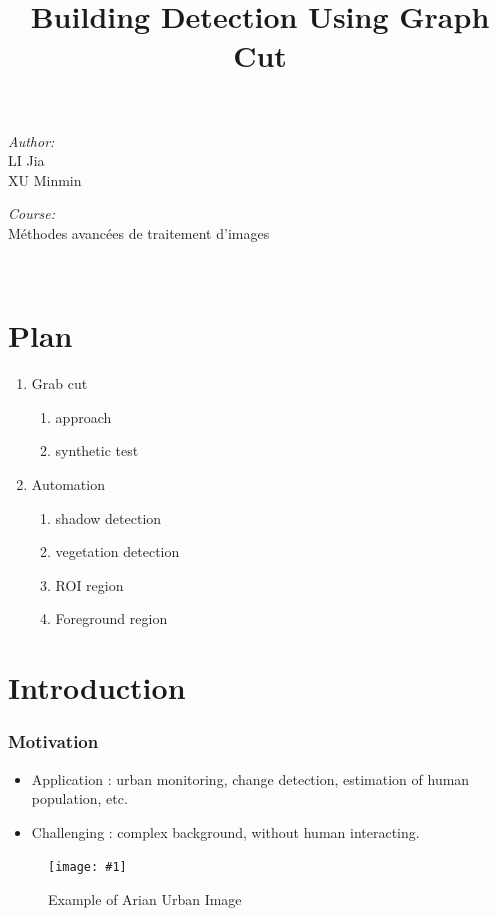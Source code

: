 \documentclass[compress]{beamer} %
\newcommand{\insertF}[3]{
  \begin{figure}[h!]
    \centering
    \begin{minipage}{#3\linewidth}
    \texttt{[image: \#1]}
    \end{minipage}  
      \caption{#2}
  \end{figure}  
}
\begin{document}
 \title{Building Detection Using Graph Cut}  

 \begin{frame}
\titlepage
    \centering
    \begin{minipage}{0.4\textwidth}
    \begin{flushleft} \large
    \emph{Author:}\\
    LI Jia\\
    XU Minmin\\
    
    \end{flushleft}
    \end{minipage}
    \begin{minipage}{0.4\textwidth}
    \begin{flushright} \large
    \emph{Course:}\\
    Méthodes avancées de traitement d'images 
    \end{flushright}
    \end{minipage}\\[3cm]
 \end{frame}

 \section{Plan}
 \begin{frame}
  \scriptsize
  {
  \begin{enumerate}
  \item Grab cut 
    \begin{enumerate}
     \item approach
     \item synthetic test
    \end{enumerate}
  \item Automation
    \begin{enumerate}
     \item shadow detection
     \item vegetation detection
     \item ROI region
     \item Foreground region
    \end{enumerate}
  \end{enumerate}
  }
 \end{frame} 
 
 \section{Introduction}
 \begin{frame}
  \frametitle{Motivation}
  \begin{itemize}
   \item Application : urban monitoring, change detection, estimation of human population, etc.
   \item Challenging : complex background, without human interacting.
  \end{itemize}
  \insertF{vatican-city-satellite-image-ikonos-high-resolution}{Example of Arian Urban Image}{0.4}
 \end{frame}
\end{document}

